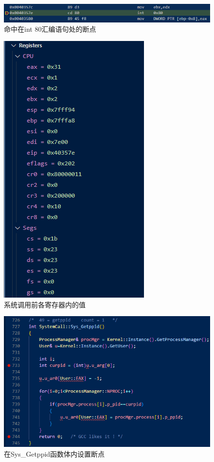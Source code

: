\begin{figure}[!htbp]
    \centering
    \includegraphics[width=\textwidth]{images/disammble_breakpoint.png}
    \caption{命中在int 80汇编语句处的断点}\label{disammble}
\end{figure}

\begin{figure}[!htbp]
    \centering
    \includegraphics[scale=1]{images/int80.png}
    \caption{系统调用前各寄存器内的值}\label{int80}
\end{figure}

\begin{figure}[!htbp]
    \centering
    \includegraphics[width=\textwidth]{images/sys_brakpoint.png}
    \caption{在Sys\_Getppid函数体内设置断点}\label{sys_breakpoint}
\end{figure}

